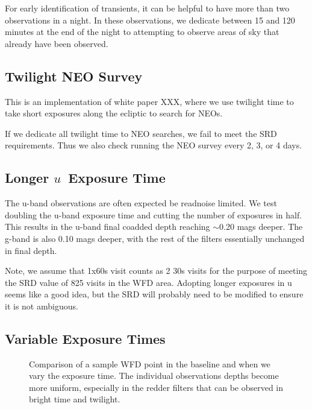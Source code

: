 For early identification of transients, it can be helpful to have more than two observations in a night. In these observations, we dedicate between 15 and 120 minutes at the end of the night to attempting to observe areas of sky that already have been observed.

\subsection{Twilight NEO Survey}

This is an implementation of white paper XXX, where we use twilight time to take short exposures along the ecliptic to search for NEOs. 

If we dedicate all twilight time to NEO searches, we fail to meet the SRD requirements. Thus we also check running the NEO survey every 2, 3, or 4 days.

\subsection{Longer $u$\ Exposure Time}\label{ss:u60}

The u-band observations are often expected be readnoise limited. We test doubling the u-band exposure time and cutting the number of exposures in half. This results in the u-band final coadded depth reaching $\sim$0.20 mags deeper. The g-band is also 0.10 mags deeper, with the rest of the filters essentially unchanged in final depth.

Note, we assume that 1x60s visit counts as 2 30s visits for the purpose of meeting the SRD value of 825 visits in the WFD area. Adopting longer exposures in u seems like a good idea, but the SRD will probably need to be modified to ensure it is not ambiguous.

\subsection{Variable Exposure Times}

\begin{figure}
\caption{Comparison of a sample WFD point in the baseline and when we vary the exposure time. The individual observations depths become more uniform, especially in the redder filters that can be observed in bright time and twilight.}\label{fig:varexptime}
\end{figure}

